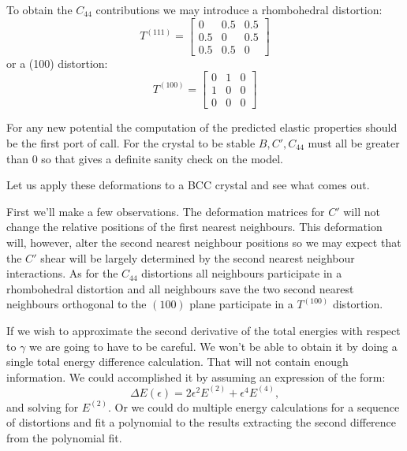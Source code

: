 To obtain the $C_{44}$ contributions we may introduce
a rhombohedral distortion:
%
\begin{equation}
T^{(111)} =  
    \begin{bmatrix}
             0   & 0.5 & 0.5 \\
             0.5 & 0   & 0.5 \\    
             0.5 & 0.5 & 0 
    \end{bmatrix}
\end{equation}
%
or a (100) distortion:
%
\begin{equation}
T^{(100)} =  
\begin{bmatrix}
             0 & 1 & 0 \\
             1 & 0 & 0 \\    
             0 & 0 & 0 
\end{bmatrix}
\end{equation}
%

For any new potential the computation of the predicted elastic properties should
be the first port of call. For the crystal to be stable $B,C',C_{44}$ must all be
greater than 0 so that gives a definite sanity check on the model. 

Let us apply these deformations to a BCC crystal and see what comes out.

First we'll make a few observations. The deformation matrices for
$C'$ will not change the relative positions of the first nearest neighbours.
This deformation will, however, alter the second nearest neighbour positions so we may expect
that the $C'$ shear will be largely determined by the second nearest neighbour interactions. 
As for the $C_{44}$ distortions all neighbours participate in a rhombohedral distortion
and all neighbours save the two second nearest neighbours orthogonal to the $(100)$
plane participate in a $T^{(100)}$ distortion. 

If we wish to approximate the second derivative of the total energies with 
respect to $\gamma$ we are going to have to be careful. We won't be able
to obtain it by doing a single total energy difference calculation. That
will not contain enough information. We could accomplished it by assuming
an expression of the form: 
\begin{equation}
\Delta E(\epsilon) = 2\epsilon^{2} E^{(2)} + \epsilon^{4} E^{(4)},
\end{equation}
and solving for $E^{(2)}$. Or we could do multiple energy calculations for a sequence 
of distortions and fit a polynomial to the results extracting
the second difference from the polynomial fit.

